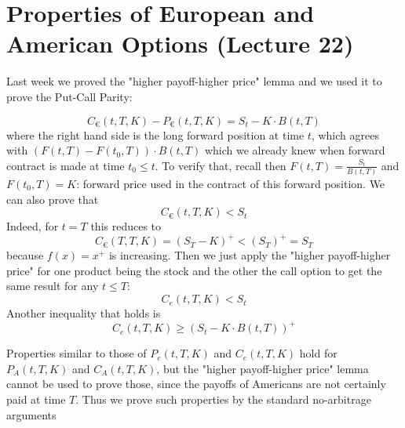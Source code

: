 \documentclass[oneside]{book}
\begin{document}
\section{Properties of European and American Options (Lecture 22)}
Last week we proved the "higher payoff-higher price" lemma and we used it to prove
 the Put-Call Parity:

 $$
 C_\euro(t, T, K) - P_\euro(t, T, K)  = S_t - K \cdot B(t,T)
 $$
 where the right hand side is the long forward position at time $t$, which agrees with
 $(F(t,T) -F(t_0, T)) \cdot B(t,T)$ which we already knew when forward contract is made
 at time $t_0 \leq t$. To verify that, recall then $F(t,T) = \frac{S_t}{B(t,T)}$ and
 $F(t_0, T) = K$: forward price used in the contract of this forward position.
 We can also prove that
 $$
    C_\euro(t,T,K) < S_t
 $$
 Indeed, for $t=T$ this reduces to
 $$
    C_\euro(T,T,K) = (S_T - K)^+ < (S_T)^+ = S_T
 $$
 because $f(x) = x^+$ is increasing.
 Then we just apply the "higher payoff-higher price" for one product being the
 stock and the other the call option to get the same result for any $t \leq T$:
 $$
 C_e(t,T,K) < S_t
 $$
 Another inequality that holds is
 $$
 C_e(t,T,K) \geq (S_t - K\cdot B(t,T))^+
 $$


Properties similar to those of $P_e(t, T, K)$ and $C_e(t, T, K)$ hold for $P_A(t, T, K)$ and
$C_A(t, T, K)$, but the "higher payoff-higher price" lemma cannot be used to prove those,
since the payoffs of Americans are not certainly paid at time $T$. Thus we prove such
properties by the standard no-arbitrage arguments

\end{document}
